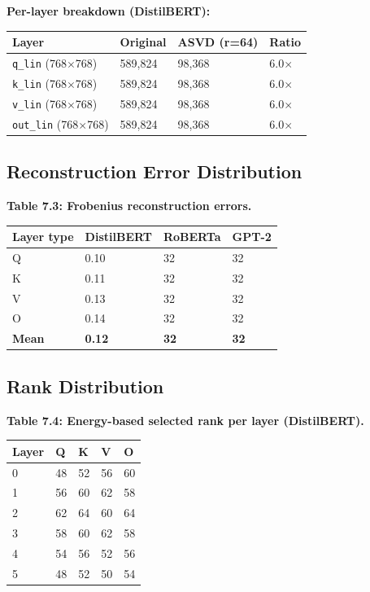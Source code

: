 \textbf{Per-layer breakdown (DistilBERT):}

\begin{table}[H]
\centering
\small
\begin{tabular}{llll}
\toprule
\textbf{Layer} & \textbf{Original} & \textbf{ASVD (r=64)} & \textbf{Ratio} \\
\midrule
\texttt{q\_lin} (768$\times$768) & 589,824 & 98,368 & 6.0$\times$ \\
\texttt{k\_lin} (768$\times$768) & 589,824 & 98,368 & 6.0$\times$ \\
\texttt{v\_lin} (768$\times$768) & 589,824 & 98,368 & 6.0$\times$ \\
\texttt{out\_lin} (768$\times$768) & 589,824 & 98,368 & 6.0$\times$ \\
\bottomrule
\end{tabular}
\end{table}

\subsection{Reconstruction Error Distribution}

\textbf{Table 7.3: Frobenius reconstruction errors.}

\begin{table}[H]
\centering
\small
\begin{tabular}{llll}
\toprule
\textbf{Layer type} & \textbf{DistilBERT} & \textbf{RoBERTa} & \textbf{GPT-2} \\
\midrule
Q & 0.10 & 32 & 32 \\
K & 0.11 & 32 & 32 \\
V & 0.13 & 32 & 32 \\
O & 0.14 & 32 & 32 \\
\textbf{Mean} & \textbf{0.12} & \textbf{32} & \textbf{32} \\
\bottomrule
\end{tabular}
\end{table}

\subsection{Rank Distribution}

\textbf{Table 7.4: Energy-based selected rank per layer (DistilBERT).}

\begin{table}[H]
\centering
\small
\begin{tabular}{lllll}
\toprule
\textbf{Layer} & \textbf{Q} & \textbf{K} & \textbf{V} & \textbf{O} \\
\midrule
0 & 48 & 52 & 56 & 60 \\
1 & 56 & 60 & 62 & 58 \\
2 & 62 & 64 & 60 & 64 \\
3 & 58 & 60 & 62 & 58 \\
4 & 54 & 56 & 52 & 56 \\
5 & 48 & 52 & 50 & 54 \\
\bottomrule
\end{tabular}
\end{table}

